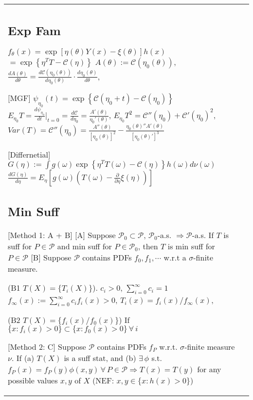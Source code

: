 \begin{tabulary}{\textwidth}{l || L}


	\subsection{Exp Fam}
	$f_\theta(x)=\exp\left[\eta(\theta)Y(x)-\xi(\theta)\right]h(x)$
	$= \exp\left\{\eta^T T - \mathcal{C}(\eta)\right\} $
	$A(\theta):=\mathcal{C}(\eta_0(\theta))$, \,
	$\frac{dA(\theta)}{d\theta}=\frac{d\mathcal{C}(\eta_0(\theta))}{d\eta_0(\theta)}\cdot\frac{d\eta_0(\theta)}{d\theta}$,

	[MGF]
	$ \psi_{\eta_0}(t) = \exp\left\{\mathcal{C}(\eta_0+t)-\mathcal{C}(\eta_0)\right\} $
	$
		E_{\eta_0} T = \frac{d\psi_{\eta_0}}{dt}|_{t=0} = \frac{d\mathcal{C}}{d\eta_0}
		=\frac{A'(\theta)}{\eta_0'(\theta)}
	$,
	$
		E_{\eta_0}T^2 = \mathcal{C}''(\eta_0) + \mathcal{C}'(\eta_0)^2
	$,
	$
		Var(T) = \mathcal{C}''(\eta_0) = \frac{A''(\theta)}{[\eta_0(\theta)]^2} - \frac{\eta_0(\theta)''A'(\theta)}{[\eta_0(\theta)']^3}
	$

	[Differnetial]
	$
		G(\eta) := \int g(\omega) \exp\left\{\eta^T T(\omega)-\mathcal{C}(\eta)\right\}h(\omega) d\nu(\omega)
	$
	$
		\frac{dG(\eta)}{d\eta} = E_\eta \left[g(\omega) \left(T(\omega) - \frac{\partial}{\partial\eta}\xi(\eta)\right)\right]
	$

	\subsection{Min Suff}

	[Method 1: A + B]
	[A]
	Suppose $\mathcal{P}_0\subset\mathcal{P}$, $\mathcal{P}_0$-a.s.
	$\Rightarrow \mathcal{P}$-a.s.
	If $T$ is suff for $P\in\mathcal{P}$ and min suff for $P\in\mathcal{P}_0$,
	then $T$ is min suff for $P\in\mathcal{P}$
	[B]
	Suppose $\mathcal{P}$ contains PDFs $f_0, f_1, \cdots$ w.r.t a $\sigma$-finite measure.

	(B1 $T(X)=\{T_i(X)\}$).
	$c_i>0$, $\sum_{i=0}^\infty c_i=1$
	$f_\infty(x) := \sum_{i=0}^\infty c_if_i(x) > 0$,
	$T_i(x)=f_i(x)/f_\infty(x)$,

	(B2 $T(X)=\{f_i(x)/f_0(x)\}$) If $\{x:f_i(x)>0\}\subset \{x: f_0(x) > 0\} \, \forall \, i$

	[Method 2: C]
	Suppose $\mathcal{P}$ contains PDFs $f_P$ w.r.t. $\sigma$-finite measure $\nu$. If
	(a) $T(X)$ is a suff stat, and
	(b) $\exists \, \phi$ s.t.
	$
		f_P(x) = f_P(y)\phi(x, y) \, \forall \, P\in\mathcal{P} \Rightarrow T(x)=T(y)
	$
	for any possible values $x, y$ of $X$ (NEF: $x, y\in\{x:h(x)>0\}$)


\end{tabulary}
